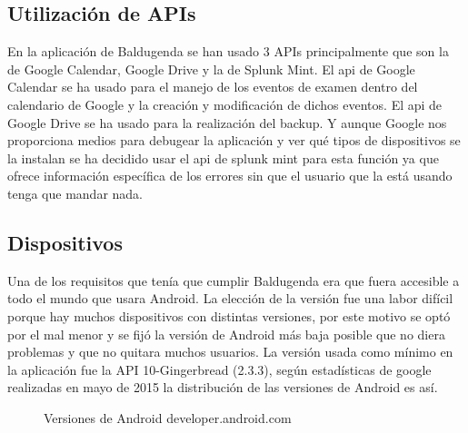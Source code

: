 \subsection{Utilización de APIs}
\label{subsecc:Utilización de APIs}

En la aplicación de Baldugenda se han usado 3 APIs principalmente que son la de Google Calendar, Google Drive y la de Splunk Mint.
El api de Google Calendar se ha usado para el manejo de los eventos de examen dentro del calendario de Google y la creación y modificación de dichos eventos.
El api de Google Drive se ha usado para la realización del backup.
Y aunque Google nos proporciona medios para debugear la aplicación y ver qué tipos de dispositivos se la instalan se ha decidido usar el api de splunk mint para esta función ya que ofrece información específica de los errores sin que el usuario que la está usando tenga que mandar nada.

\subsection{Dispositivos}
\label{subsecc:Dispositivos}

Una de los requisitos que tenía que cumplir Baldugenda era que fuera accesible a todo el mundo que usara Android. La elección de la versión fue una labor difícil porque hay muchos dispositivos con distintas versiones, por este motivo se optó por el mal menor y se fijó la versión de Android más baja posible que no diera problemas y que no quitara muchos usuarios.
La versión usada como mínimo en la aplicación fue la API 10-Gingerbread (2.3.3), según estadísticas de google realizadas en mayo de 2015 la distribución de las versiones de Android es así.

\begin{figure}[H] 
  \begin{center} 
    \caption{Versiones de Android developer.android.com} 
    \label{fig:VersionesAndroid} 
  \end{center} 
\end{figure}

